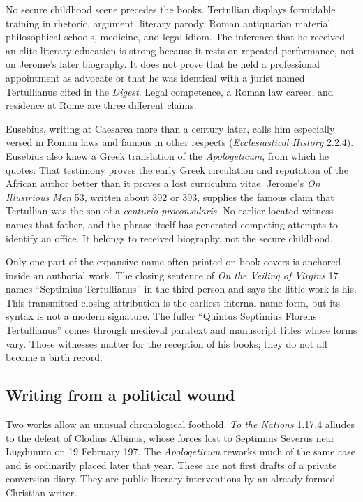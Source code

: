 No secure childhood scene precedes the books. Tertullian displays formidable
training in rhetoric, argument, literary parody, Roman antiquarian material,
philosophical schools, medicine, and legal idiom. The inference that he received
an elite literary education is strong because it rests on repeated performance,
not on Jerome's later biography. It does not prove that he held a professional
appointment as advocate or that he was identical with a jurist named
Tertullianus cited in the \emph{Digest}. Legal competence, a Roman law career,
and residence at Rome are three different claims.

Eusebius, writing at Caesarea more than a century later, calls him especially
versed in Roman laws and famous in other respects (\emph{Ecclesiastical
History} 2.2.4). Eusebius also knew a Greek translation of the
\emph{Apologeticum}, from which he quotes. That testimony proves the early
Greek circulation and reputation of the African author better than it proves a
lost curriculum vitae. Jerome's \emph{On Illustrious Men} 53, written about
392 or 393, supplies the famous claim that Tertullian was the son of a
\emph{centurio proconsularis}. No earlier located witness names that father,
and the phrase itself has generated competing attempts to identify an office.
It belongs to received biography, not the secure childhood.

Only one part of the expansive name often printed on book covers is anchored
inside an authorial work. The closing sentence of \emph{On the Veiling of
Virgins} 17 names ``Septimius Tertullianus'' in the third person and says the
little work is his. This transmitted closing attribution is the earliest
internal name form, but its syntax is not a modern signature. The fuller
``Quintus Septimius Florens Tertullianus'' comes through medieval paratext and
manuscript titles whose forms vary. Those witnesses matter for the reception of
his books; they do not all become a birth record.

\subsection{Writing from a political wound}

Two works allow an unusual chronological foothold. \emph{To the Nations}
1.17.4 alludes to the defeat of Clodius Albinus, whose forces lost to Septimius
Severus near Lugdunum on 19 February 197. The \emph{Apologeticum} reworks much
of the same case and is ordinarily placed later that year. These are not first
drafts of a private conversion diary. They are public literary interventions
by an already formed Christian writer.

